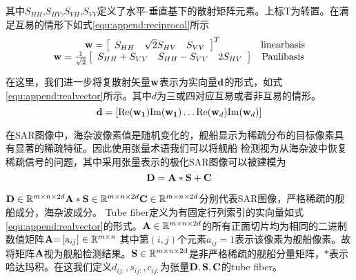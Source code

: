 其中$S_{HH}$,$S_{HV}$,$S_{VH}$,$S_{VV}$定义了水平-垂直基下的散射矩阵元素。上标T为转置。在满足互易的情形下如式\ref{equ:append:reciprocal}所示
\begin{equation}
    \label{equ:append:reciprocal}
    \begin{array}{*{20}{c}}
    {{\bf{w}} = {{\left[ {\begin{array}{*{20}{c}}
    {{S_{HH}}}&{\sqrt 2 {S_{HV}}}&{{S_{VV}}}
    \end{array}} \right]}^T}}&{{\rm{linear basis}}}\\
    {{\bf{w}} = \frac{1}{{\sqrt 2 }}\left[ {\begin{array}{*{20}{c}}
    {{S_{HH}} + {S_{VV}}}&{{S_{HH}} - {S_{VV}}}&{2{S_{HV}}}
    \end{array}} \right]}&{{\rm{Pauli basis}}}
    \end{array}
\end{equation}

在这里，我们进一步将复散射矢量$\bf{w}$表示为实向量$\bf{d}$的形式，如式\ref{equ:append:realvector}所示。其中$d$为三或四对应互易或者非互易的情形。
\begin{equation}
    \label{equ:append:realvector}
   {\bf{d}} = \left[ {{\mathop{\rm Re}\nolimits} ({{\bf{w}}_{\bf{1}}}){\mathop{\rm Im}\nolimits} ({{\bf{w}}_{\bf{1}}}) \ldots {\mathop{\rm Re}\nolimits} ({{\bf{w}}_d}){\mathop{\rm Im}\nolimits} ({{\bf{w}}_d})} \right] 
\end{equation}

在SAR图像中，海杂波像素值是随机变化的，舰船显示为稀疏分布的目标像素具有显著的稀疏特征。因此使用张量术语我们可以将舰船
检测视为从海杂波中恢复稀疏信号的问题，其中采用张量表示的极化SAR图像可以被建模为
\begin{equation}
    \label{equ:append:construct}
    {\bf{D = A*S + C}}
\end{equation}

${\bf{D}} \in {\mathbb{R}^{m \times n \times 2d}}{\bf{A*S}} \in {\mathbb{R}^{m \times n \times 2d}}{\bf{C}} \in {\mathbb{R}^{m \times n \times 2d}}$分别代表SAR图像，严格稀疏的舰船成分，海杂波成分。
Tube fiber定义为有固定行列索引的实向量如式\ref{equ:append:realvector}的形式。${\bf{A}} \in {\mathbb{R}^{m \times n \times 2d}}$的所有正面切片均为相同的二进制数值矩阵${\bf{A}}{\rm{ = }}\left[ {{{\rm{a}}_{ij}}} \right] \in {\mathbb{R}^{m \times n}}$
其中第$(i,j)$个元素$a_{ij}=1$表示该像素为舰船像素。故将矩阵$\bf{A}$视为舰船检测结果。${\bf{S}} \in {\mathbb{R}^{m \times n \times 2{\rm{d}}}}$是非严格稀疏的舰船分量矩阵，$*$表示哈达玛积。在这我们定义$d_{ij:},s_{ij:},c_{ij:}$为张量${\bf{D,S,C}}$的tube fiber。

